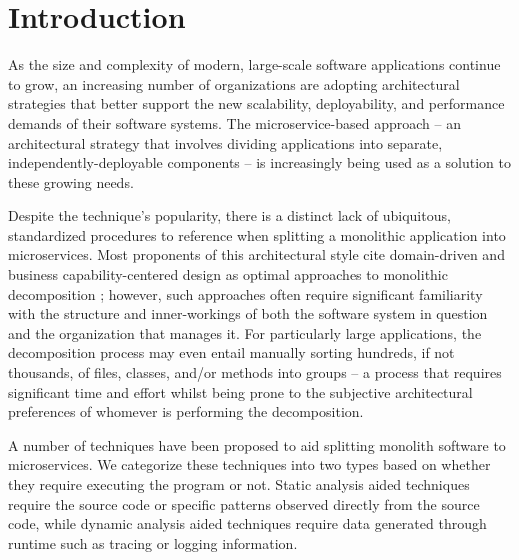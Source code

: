 \section{Introduction}
\label{sec:intro}


As the size and complexity of modern, large-scale software applications continue to grow, an increasing number of organizations are adopting architectural strategies that better support the new scalability, deployability, and performance demands of their software systems. The microservice-based approach -- an architectural strategy that involves dividing applications into separate, independently-deployable components -- is increasingly being used as a solution to these growing needs. 



Despite the technique's popularity, there is a distinct lack of ubiquitous, standardized procedures to reference when splitting a monolithic application into microservices. Most proponents of this architectural style cite domain-driven and business capability-centered design as optimal approaches to monolithic decomposition 
; however, such approaches often require significant familiarity with the structure and inner-workings of both the software system in question and the organization that manages it. For particularly large applications, the decomposition process may even entail manually sorting hundreds, if not thousands, of files, classes, and/or methods into groups -- a process that requires significant time and effort whilst being prone to the subjective architectural preferences of whomever is performing the decomposition. 


A number of techniques have been proposed to aid splitting monolith software to microservices. We categorize these techniques into two types based on whether they require executing the program or not. Static analysis aided techniques require the source code or specific patterns observed directly from the source code, while dynamic analysis aided techniques require data generated through runtime such as tracing or logging information.



